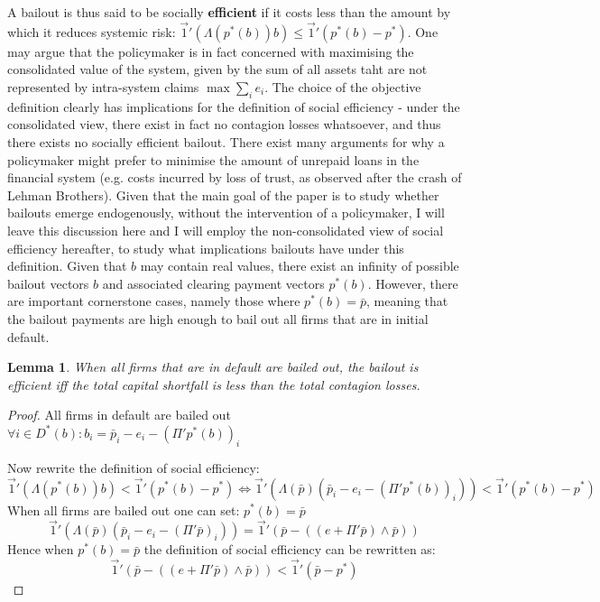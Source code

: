 \documentclass[12pt,a4paper]{article}
\newtheorem{lemma}{Lemma}
\begin{document}
A bailout is thus said to be socially \textbf{efficient} if it costs less than the amount by which it reduces systemic risk: $\vec{1}' (\Lambda (p^* (b))b) \le \vec{1}' (p^* (b)-p^* )$. One may argue that the policymaker is in fact concerned with maximising the consolidated value of the system, given by the sum of all assets taht are not represented by intra-system claims $\max \sum_{i}e_i$. The choice of the objective definition clearly has implications for the definition of social efficiency - under the consolidated view, there exist in fact no contagion losses whatsoever, and thus there exists no socially efficient bailout. There exist many arguments for why a policymaker might prefer to minimise the amount of unrepaid loans in the financial system (e.g. costs incurred by loss of trust, as observed after the crash of Lehman Brothers). Given that the main goal of the paper is to study whether bailouts emerge endogenously, without the intervention of a policymaker, I will leave this discussion here and I will employ the non-consolidated view of social efficiency hereafter, to study what implications bailouts have under this definition.
Given that $b$ may contain real values, there exist an infinity of possible bailout vectors $b$ and associated clearing payment vectors $p^*(b)$. However, there are important cornerstone cases, namely those where $p^*(b) = \bar{p}$, meaning that the bailout payments are high enough to bail out all firms that are in initial default.

\begin{lemma} \label{lem:efficientbailout}
When all firms that are in default are bailed out, the bailout is efficient iff the total capital shortfall is less than the total contagion losses.
\end{lemma}

\begin{proof}
All firms in default are bailed out $\forall i \in D^* (b) \colon b_i=\bar{p}_i-e_i-(\Pi' p^* (b))_i$

Now rewrite the definition of social efficiency:
\[
\vec{1}' (\Lambda(p^* (b))b) < \vec{1}' (p^* (b)-p^* ) \Leftrightarrow
\vec{1}' (\Lambda(\bar{p})(\bar{p}_i-e_i-(\Pi' p^* (b))_i )) < \vec{1}' (p^* (b)-p^* )
\]
When all firms are bailed out one can set: $p^* (b)=\bar{p}$
\[
\vec{1}' (\Lambda(\bar{p})(\bar{p}_i-e_i-(\Pi' \bar{p})_i ))= \vec{1}' (\bar{p}-((e+\Pi' \bar{p}) \wedge \bar{p}))
\]
Hence when $p^* (b)=\bar{p}$ the definition of social efficiency can be rewritten as:
\[
\vec{1}' (\bar{p}-((e+\Pi' \bar{p}) \wedge \bar{p})) < \vec{1}' (\bar{p}-p^* )
\]
\end{proof}
\end{document}
